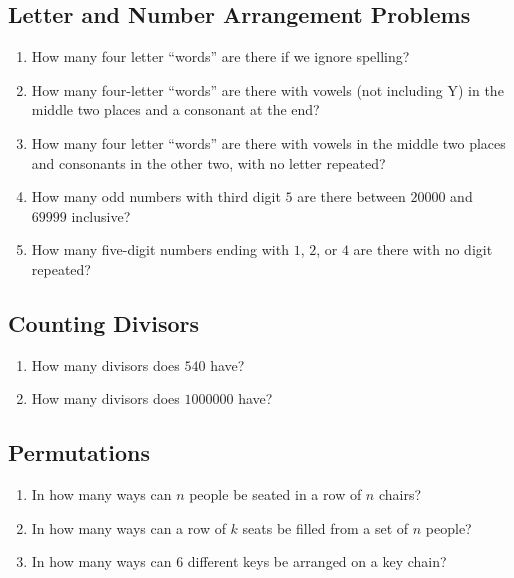 \documentclass[twocolumn]{article}
\begin{document}
\subsection*{Letter and Number Arrangement Problems}
\begin{enumerate}
	\item How many four letter ``words'' are there if we ignore spelling?
		\vspace{3cm}
	\item How many four-letter ``words'' are there with vowels (not including Y) 
		in the middle two places and a consonant at the end?
		\vspace{3cm}
	\item How many four letter ``words'' are there with vowels in the middle two 
		places and consonants in the other two, with no letter repeated?
		\vspace{3cm}
	\item How many odd numbers with third digit $5$ are there between $20000$ 
		and $69999$ inclusive?
		\vspace{3cm}
	\item How many five-digit numbers ending with $1$, $2$, or $4$ are there 
		with no digit repeated?
		\vspace{3cm}
\end{enumerate}

\subsection*{Counting Divisors}
\begin{enumerate}[resume]
	\item How many divisors does $540$ have?
		\vspace{3cm}
	\item How many divisors does $\num{1000000}$ have?
		\vspace{3cm}
\end{enumerate}

\subsection*{Permutations}
\begin{enumerate}[resume]
	\item In how many ways can $n$ people be seated in a row of $n$ chairs?
		\vspace{3cm}
	\item In how many ways can a row of $k$ seats be filled from a set of $n$ 
		people?
		\vspace{3cm}
	\item In how many ways can $6$ different keys be arranged on a key chain?
		\vspace{3cm}
\end{enumerate}
\end{document}
